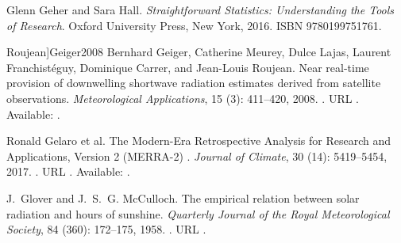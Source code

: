 \documentclass[letterpaper,12pt, twoside]{report}
\providecommand{\DIFdeltex}[1]{{\protect\color{red} \scriptsize #1}} %
\providecommand{\DIFdel}[1]{\texorpdfstring{\DIFdeltex{#1}}{}} %
\begin{document}
\DIFdel{Glenn Geher and Sara Hall.
}%
\DIFdel{\emph{Straightforward Statistics: Understanding the Tools of
  Research}.
}%
\DIFdel{Oxford University Press, New York, 2016.
}%
\DIFdel{ISBN 9780199751761.
}%

  Roujean]{Geiger2008}
\DIFdel{Bernhard Geiger, Catherine Meurey, Dulce Lajas, Laurent Franchistéguy,
  Dominique Carrer, and Jean-Louis Roujean.
}%
\DIFdel{Near real-time provision of downwelling shortwave radiation estimates
  derived from satellite observations.
}%
\DIFdel{\emph{Meteorological Applications}, 15}%
\DIFdel{(3):}%
\DIFdel{411--420, 2008.
}%
\DIFdel{.
}%
\DIFdel{URL
  }%
\DIFdel{.
}%
\DIFdel{Available: }%
\DIFdel{.
}%

\DIFdel{Ronald }%
\DIFdel{Gelaro et al.}%
\DIFdel{The }%
\DIFdel{Modern-Era Retrospective Analysis for Research and Applications,
  Version 2 (MERRA-2)}%
\DIFdel{.
}%
\DIFdel{\emph{Journal of Climate}, 30}%
\DIFdel{(14):}%
\DIFdel{5419--5454,
  2017.
}%
\DIFdel{.
}%
\DIFdel{URL
  }%
\DIFdel{.
}%
\DIFdel{Available: }%
\DIFdel{.
}%

\DIFdel{J.~Glover and J.~S.~G. McCulloch.
}%
\DIFdel{The empirical relation between solar radiation and hours of sunshine.
}%
\DIFdel{\emph{Quarterly Journal of the Royal Meteorological Society},
  84}%
\DIFdel{(360):}%
\DIFdel{172--175, 1958.
}%
\DIFdel{.
}%
\DIFdel{URL
  }%
\DIFdel{.
}%
\end{document}

